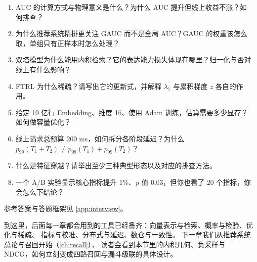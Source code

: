 \begin{interview}[本章对应的面试题]
\begin{enumerate}
  \item AUC 的计算方式与物理意义是什么？为什么 AUC 提升但线上收益不涨？如何排查？
  \item 为什么推荐系统精排更关注 GAUC 而不是全局 AUC？GAUC 的权重该怎么取，单组只有正样本时怎么处理？
  \item 双塔模型为什么能用内积检索？它的表达能力损失体现在哪里？归一化与否对线上有什么影响？
  \item FTRL 为什么稀疏？请写出它的更新式，并解释 $\lambda_1$ 与累积梯度 $z$ 各自的作用。
  \item 给定 10 亿行 Embedding、维度 16、使用 Adam 训练，估算需要多少显存？如何做容量优化？
  \item 线上请求总预算 200 ms，如何拆分各阶段延迟？为什么 $p_{99}(T_1+T_2) \ne p_{99}(T_1) + p_{99}(T_2)$？
  \item 什么是特征穿越？请举出至少三种典型形态以及对应的排查方法。
  \item 一个 A/B 实验显示核心指标提升 1\%、p 值 0.03，但你也看了 20 个指标，你会怎么下结论？
\end{enumerate}
参考答案与答题框架见 \cref{app:interview}。
\end{interview}

到这里，后面每一章都会用到的工具已经备齐：向量表示与检索、概率与检验、优化与稀疏、
指标与校准、分布式与延迟、数仓与一致性。
下一章我们从推荐系统总论与召回开始（\cref{ch:recall}），
读者会看到本节里的内积几何、负采样与 NDCG，如何立刻变成四路召回与漏斗级联的具体设计。
